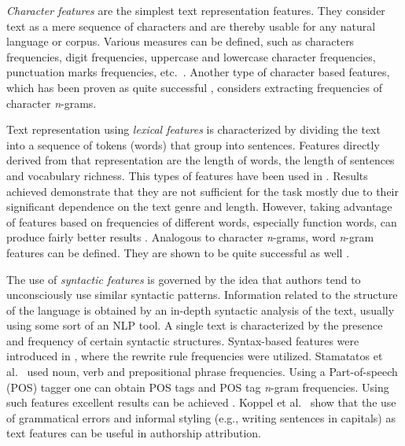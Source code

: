 \documentclass{llncs}
\begin{document}
\emph{Character features} are the simplest text representation features. They
consider text as a mere sequence of characters and are thereby usable for any
natural language or corpus. Various measures can be defined, such as
characters frequencies, digit frequencies, uppercase and lowercase character
frequencies, punctuation marks frequencies, etc.\ \cite{de2001mining}. Another
type of character based features, which has been proven as quite successful
\cite{peng2003language,stamatatos2006ensemble}, considers extracting
frequencies of character \emph{n}-grams. 

Text representation using \emph{lexical features} is characterized by dividing
the text into a sequence of tokens (words) that group into sentences. Features
directly derived from that representation are the length of words, the
length of sentences and vocabulary richness. This types of features have been used in
\cite{holmes1994authorship,mendenhall1887} . Results achieved demonstrate that
they are not sufficient for the task mostly due to their
significant dependence on the text genre and length. However, taking advantage of
features based on frequencies of different words, especially function words,
can produce fairly better results
\cite{argamon2005measuring,koppel2003exploiting,uzuner2005comparative,zhao2005effective}.
Analogous to character \emph{n}-grams, word \emph{n}-gram features
can be defined. They are shown to be quite successful as well
\cite{coyotl2006authorship,keselj2003n}.

The use of \emph{syntactic features} is governed by the idea that authors tend to
unconsciously use similar syntactic patterns. Information related to the
structure of the language is obtained by an in-depth syntactic analysis of the
text, usually using some sort of an NLP tool. A single text is characterized by
the presence and frequency of certain syntactic structures. Syntax-based features
were introduced in \cite{van1996outside}, where the rewrite rule frequencies
were utilized. Stamatatos et al.\ \cite{stamatatos2001computer} used noun, verb
and prepositional phrase frequencies. Using a Part-of-speech (POS) tagger one can
obtain POS tags and POS tag \emph{n}-gram frequencies. Using such features
excellent results can be achieved
\cite{diederich2003authorship,koppel2003exploiting,kukushkina2001using,luyckx2005shallow}.
Koppel et al.\ \cite{koppel2003exploiting} show that the use of grammatical
errors and informal styling (e.g., writing sentences in capitals) as text features
can be useful in authorship attribution.
\end{document}
